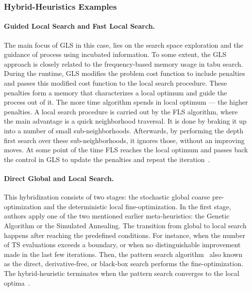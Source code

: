 \subsubsection{Hybrid-Heuristics Examples}
\paragraph{Guided Local Search and Fast Local Search.}
The main focus of GLS in this case, lies on the search space exploration and the guidance of process using incubated information. To some extent, the GLS approach is closely related to the frequency-based memory usage in tabu search. During the runtime, GLS modifies the problem cost function to include penalties and passes this modified cost function to the local search procedure. These penalties form a memory that characterizes a local optimum and guide the process out of it. The more time algorithm spends in local optimum — the higher penalties. A local search procedure is carried out by the FLS algorithm, where the main advantage is a quick neighborhood traversal. It is done by braking it up into a number of small sub-neighborhoods. Afterwards, by performing the depth first search over these sub-neighborhoods, it ignores those, without an improving moves. At some point of the time FLS reaches the local optimum and passes back the control in GLS to update the penalties and repeat the iteration~\cite{tsang1997fast}.

\paragraph{Direct Global and Local Search.}
This hybridization consists of two stages: the stochastic global coarse pre-optimization and the deterministic local fine-optimization. In the first stage, authors apply one of the two mentioned earlier meta-heuristics: the Genetic Algorithm or the Simulated Annealing. The transition from global to local search happens after reaching the predefined conditions. For instance, when the number of TS evaluations exceeds a boundary, or when no distinguishable improvement made in the last few iterations. Then, the pattern search algorithm~\cite{hooke1961direct} also known as the direct, derivative-free, or black-box search performs the fine-optimization. The hybrid-heuristic terminates when the pattern search converges to the local optima~\cite{syrjakow1999efficient}.

